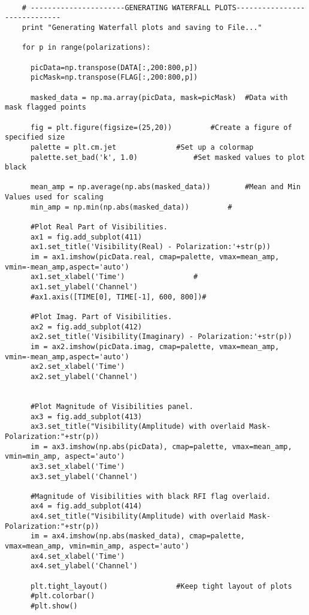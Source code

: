\begin{verbatim}
    
    # ----------------------GENERATING WATERFALL PLOTS-----------------------------
    print "Generating Waterfall plots and saving to File..."
    
    for p in range(polarizations):		

      picData=np.transpose(DATA[:,200:800,p])
      picMask=np.transpose(FLAG[:,200:800,p])

      masked_data = np.ma.array(picData, mask=picMask)	#Data with mask flagged points
      
      fig = plt.figure(figsize=(25,20))			#Create a figure of specified size
      palette = plt.cm.jet				#Set up a colormap
      palette.set_bad('k', 1.0)				#Set masked values to plot black
      
      mean_amp = np.average(np.abs(masked_data))		#Mean and Min Values used for scaling
      min_amp = np.min(np.abs(masked_data))			#
      
      #Plot Real Part of Visibilities.
      ax1 = fig.add_subplot(411)			
      ax1.set_title('Visibility(Real) - Polarization:'+str(p))
      im = ax1.imshow(picData.real, cmap=palette, vmax=mean_amp, vmin=-mean_amp,aspect='auto')
      ax1.set_xlabel('Time')				#
      ax1.set_ylabel('Channel')	
      #ax1.axis([TIME[0], TIME[-1], 600, 800])#
      
      #Plot Imag. Part of Visibilities.
      ax2 = fig.add_subplot(412)			
      ax2.set_title('Visibility(Imaginary) - Polarization:'+str(p))
      im = ax2.imshow(picData.imag, cmap=palette, vmax=mean_amp, vmin=-mean_amp,aspect='auto')
      ax2.set_xlabel('Time')
      ax2.set_ylabel('Channel')	
    
    
      #Plot Magnitude of Visibilities panel. 
      ax3 = fig.add_subplot(413)			
      ax3.set_title("Visibility(Amplitude) with overlaid Mask- Polarization:"+str(p))
      im = ax3.imshow(np.abs(picData), cmap=palette, vmax=mean_amp, vmin=min_amp, aspect='auto')
      ax3.set_xlabel('Time')				
      ax3.set_ylabel('Channel')				
      
      #Magnitude of Visibilities with black RFI flag overlaid.
      ax4 = fig.add_subplot(414)								
      ax4.set_title("Visibility(Amplitude) with overlaid Mask- Polarization:"+str(p))
      im = ax4.imshow(np.abs(masked_data), cmap=palette, vmax=mean_amp, vmin=min_amp, aspect='auto')
      ax4.set_xlabel('Time')
      ax4.set_ylabel('Channel')

      plt.tight_layout()				#Keep tight layout of plots
      #plt.colorbar()
      #plt.show()


\end{verbatim}
